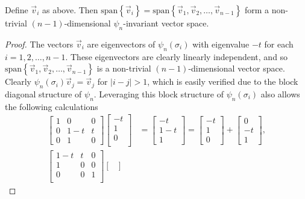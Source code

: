 \begin{proposition}
    Define $\vec{v}_i$ as above. Then $\textrm{span}\left\{ \vec{v}_i \right\} = \textrm{span}\left\{\vec{v}_1,\vec{v}_2,\dots,\vec{v}_{n-1}\right\}$ form a non-trivial $(n-1)$-dimensional $\psi_n$-invariant vector space.
\end{proposition}
\begin{proof}
    The vectors $\vec{v}_i$ are eigenvectors of $\psi_n(\sigma_i)$ with eigenvalue $-t$ for each $i=1,2,\dots,n-1$. These eigenvectors are clearly linearly independent, and so $\textrm{span}\left\{ \vec{v}_1,\vec{v}_2,\dots,\vec{v}_{n-1} \right\}$ is a non-trivial $(n-1)$-dimensional vector space. Clearly $\psi_n(\sigma_i)\vec{v}_j = \vec{v}_j$ for $|i-j|>1$, which is easily verified due to the block diagonal structure of $\psi_n$. Leveraging this block structure of $\psi_n(\sigma_i)$ also allows the following calculations
    \begin{align*}
        \begin{bmatrix}
            1 & 0 & 0 \\
            0 & 1-t & t \\
            0 & 1 & 0
        \end{bmatrix}\begin{bmatrix}
            -t \\ 1 \\ 0 \\
        \end{bmatrix} &= \begin{bmatrix}
            -t \\ 1-t \\ 1
        \end{bmatrix} = \begin{bmatrix}
            -t \\ 1 \\ 0
        \end{bmatrix} + \begin{bmatrix}
            0 \\ -t \\ 1
        \end{bmatrix}, \\
        \begin{bmatrix}
            1-t & t & 0\\
            1 & 0 & 0 \\
            0 & 0 & 1 \\
        \end{bmatrix}\begin{bmatrix}

\end{bmatrix}
\end{align*}
\end{proof}
